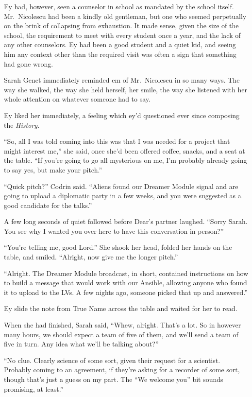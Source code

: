 Ey had, however, seen a counselor in school as mandated by the school itself. Mr.~Nicolescu had been a kindly old gentleman, but one who seemed perpetually on the brink of collapsing from exhaustion. It made sense, given the size of the school, the requirement to meet with every student once a year, and the lack of any other counselors. Ey had been a good student and a quiet kid, and seeing him any context other than the required visit was often a sign that something had gone wrong.

Sarah Genet immediately reminded em of Mr.~Nicolescu in so many ways. The way she walked, the way she held herself, her smile, the way she listened with her whole attention on whatever someone had to say.

Ey liked her immediately, a feeling which ey'd questioned ever since composing the \emph{History.}

``So, all I was told coming into this was that I was needed for a project that might interest me,'' she said, once she'd been offered coffee, snacks, and a seat at the table. ``If you're going to go all mysterious on me, I'm probably already going to say yes, but make your pitch.''

``Quick pitch?'' Codrin said. ``Aliens found our Dreamer Module signal and are going to upload a diplomatic party in a few weeks, and you were suggested as a good candidate for the talks.''

A few long seconds of quiet followed before Dear's partner laughed. ``Sorry Sarah. You see why I wanted you over here to have this conversation in person?''

``You're telling me, good Lord.'' She shook her head, folded her hands on the table, and smiled. ``Alright, now give me the longer pitch.''

``Alright. The Dreamer Module broadcast, in short, contained instructions on how to build a message that would work with our Ansible, allowing anyone who found it to upload to the LVs. A few nights ago, someone picked that up and answered.''

Ey slide the note from True Name across the table and waited for her to read.

When she had finished, Sarah said, ``Whew, alright. That's a lot. So in however many hours, we should expect a team of five of them, and we'll send a team of five in turn. Any idea what we'll be talking about?''

``No clue. Clearly science of some sort, given their request for a scientist. Probably coming to an agreement, if they're asking for a recorder of some sort, though that's just a guess on my part. The ``We welcome you'' bit sounds promising, at least.''

